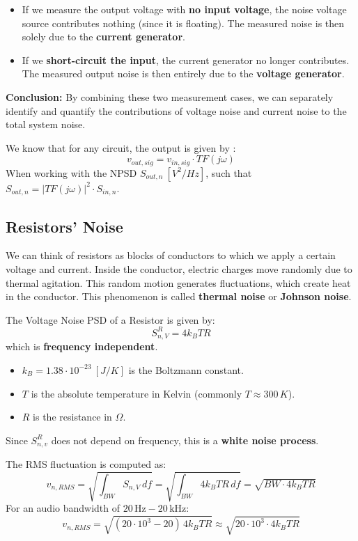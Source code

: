 \begin{itemize}
    \item If we measure the output voltage with \textbf{no input voltage}, the noise voltage source contributes nothing (since it is floating).  
    The measured noise is then solely due to the \textbf{current generator}.
    
    \item If we \textbf{short-circuit the input}, the current generator no longer contributes.  
    The measured output noise is then entirely due to the \textbf{voltage generator}.
\end{itemize}

\textbf{Conclusion:}  
By combining these two measurement cases, we can separately identify and quantify the contributions of voltage noise and current noise to the total system noise.

We know that for any circuit, the output is given by :
\[
{{v}_{out,sig}}={{v}_{in,sig}}\cdot TF\left( j\omega  \right)
\]
When working with the NPSD $S_{out,n} \ [V^2/Hz]$, such that $S_{out,n} = | TF(j \omega) |^2 \cdot S_{in,n}$.


\subsection{Resistors' Noise}

We can think of resistors as blocks of conductors to which we apply a certain voltage and current.  
Inside the conductor, electric charges move randomly due to thermal agitation.  
This random motion generates fluctuations, which create heat in the conductor.  
This phenomenon is called \textbf{thermal noise} or \textbf{Johnson noise}.

The Voltage Noise PSD of a Resistor is given by: 
\[
S^R_{n,V} = 4k_B T R
\]
which is \textbf{frequency independent}.  

\begin{itemize}
    \item $k_B = 1.38 \cdot 10^{-23}\ [J/K]$ is the Boltzmann constant.
    \item $T$ is the absolute temperature in Kelvin (commonly $T \approx 300\,K$).
    \item $R$ is the resistance in $\Omega$.
\end{itemize}

Since $S^R_{n,v}$ does not depend on frequency, this is a \textbf{white noise process}.

The RMS fluctuation is computed as:
\[
v_{n,RMS} = \sqrt{\int_{BW} S_{n,V} \, df}
= \sqrt{\int_{BW} 4 k_B T R \, df}
= \sqrt{BW \cdot 4k_B T R}
\]
For an audio bandwidth of $20\,\text{Hz} - 20\,\text{kHz}$:
\[
v_{n,RMS} = \sqrt{(20 \cdot 10^3 - 20)\, 4k_B T R}
\approx \sqrt{20 \cdot 10^3 \cdot 4k_B T R}
\]


